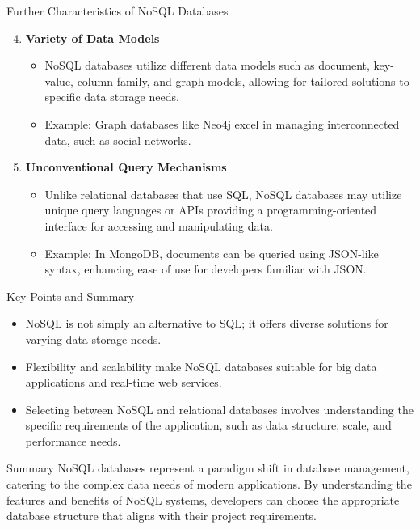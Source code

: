 \documentclass[aspectratio=169]{beamer}
\begin{document}
\begin{frame}[fragile]{Further Characteristics of NoSQL Databases}
    \begin{enumerate}
        \setcounter{enumi}{3} %
        \item \textbf{Variety of Data Models}
            \begin{itemize}
                \item NoSQL databases utilize different data models such as document, key-value, column-family, and graph models, allowing for tailored solutions to specific data storage needs.
                \item Example: Graph databases like Neo4j excel in managing interconnected data, such as social networks.
            \end{itemize}
        
        \item \textbf{Unconventional Query Mechanisms}
            \begin{itemize}
                \item Unlike relational databases that use SQL, NoSQL databases may utilize unique query languages or APIs providing a programming-oriented interface for accessing and manipulating data.
                \item Example: In MongoDB, documents can be queried using JSON-like syntax, enhancing ease of use for developers familiar with JSON.
            \end{itemize}
    \end{enumerate}
\end{frame}

\begin{frame}[fragile]{Key Points and Summary}
    \begin{itemize}
        \item NoSQL is not simply an alternative to SQL; it offers diverse solutions for varying data storage needs.
        \item Flexibility and scalability make NoSQL databases suitable for big data applications and real-time web services.
        \item Selecting between NoSQL and relational databases involves understanding the specific requirements of the application, such as data structure, scale, and performance needs.
    \end{itemize}
    
    \begin{block}{Summary}
        NoSQL databases represent a paradigm shift in database management, catering to the complex data needs of modern applications. By understanding the features and benefits of NoSQL systems, developers can choose the appropriate database structure that aligns with their project requirements.
    \end{block}
\end{frame}
\end{document}
